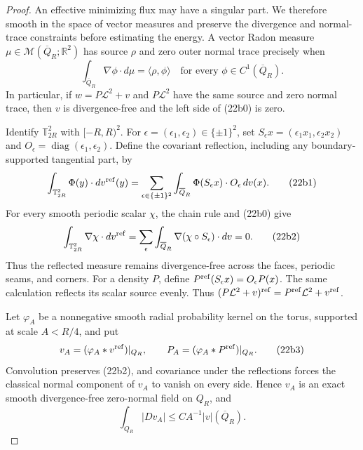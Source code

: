 \documentclass{aomart}
\theoremstyle{definition}
\newcommand{\1}{\mathbf 1}
\begin{document}
\begin{proof}
An effective minimizing flux may have a singular part.  We therefore
smooth in the space of vector measures and preserve the divergence and
normal-trace constraints before estimating the energy.  A vector
Radon measure $\mu\in\mathcal M(\overline Q_ R;\mathbb R^2)$ has
source $\rho$ and zero outer normal trace precisely when
\begin{equation}
\int_ {\overline Q_ R}\nabla\phi\cdot d\mu
=\langle\rho,\phi\rangle
\quad\text{for every }\phi\in C^1(\overline Q_ R).
\tag{22b0}
\end{equation}
In particular, if $w=P\mathcal L^2+v$ and $P\mathcal L^2$ have
the same source and zero normal trace, then $v$ is divergence-free
and the left side of (22b0) is zero.

Identify $\mathbb T_ {2R}^2$ with $[-R,R)^2$.  For
$\epsilon=(\epsilon_ 1,\epsilon_ 2)\in\{\pm1\}^2$, set
$S_ \epsilon x=(\epsilon_ 1x_ 1,\epsilon_ 2x_ 2)$ and
$O_ \epsilon=\operatorname {diag}(\epsilon_ 1,\epsilon_ 2)$.  Define
the covariant reflection, including any boundary-supported tangential
part, by
\begin{equation}
\int_ {\mathbb T_ {2R}^2}\Phi(y)\cdot dv^{\rm ref}(y)
=\sum_ {\epsilon\in\{\pm1\}^2}\int_ {\overline Q_ R}
\Phi(S_ \epsilon x)\cdot O_ \epsilon\,dv(x).
\tag{22b1}
\end{equation}
For every smooth periodic scalar $\chi$, the chain rule and (22b0)
give
\begin{equation}
\int_ {\mathbb T_ {2R}^2}\nabla\chi\cdot dv^{\rm ref}
=\sum_ \epsilon\int_ {\overline Q_ R}
\nabla(\chi\circ S_ \epsilon)\cdot dv=0.
\tag{22b2}
\end{equation}
Thus the reflected measure remains divergence-free across the faces,
periodic seams, and corners.  For a density $P$, define
$P^{\rm ref}(S_ \epsilon x)=O_ \epsilon P(x)$.  The same calculation
reflects its scalar source evenly.  Thus
$(P\mathcal L^2+v)^{\rm ref}=P^{\rm ref}\mathcal L^2+v^{\rm ref}$.

Let $\varphi_ A$ be a nonnegative smooth radial probability kernel on
the torus, supported at scale $A<R/4$, and put
\begin{equation}
v_ A=(\varphi_ A*v^{\rm ref})|_ {Q_ R},\qquad
P_ A=(\varphi_ A*P^{\rm ref})|_ {Q_ R}.
\tag{22b3}
\end{equation}
Convolution preserves (22b2), and covariance under the reflections
forces the classical normal component of $v_ A$ to vanish on every
side.  Hence $v_ A$ is an exact smooth divergence-free zero-normal
field on $Q_ R$, and
\begin{equation}
\int_ {Q_ R}|Dv_ A|\leq CA^{-1}|v|(\overline Q_ R).
\tag{22b4}
\end{equation}


\end{proof}
\end{document}
